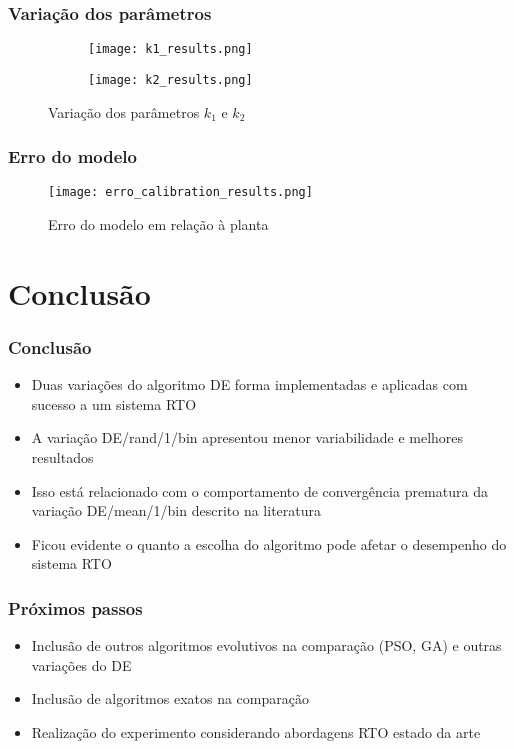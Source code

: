 \documentclass{beamer}
\begin{document}
\begin{frame}
	\frametitle{Variação dos parâmetros}
	\begin{figure}
		\centering
		\begin{subfigure}[b]{0.5\textwidth}
			\centering
			\texttt{[image: k1\_results.png]}
			\label{fig:k1_results}
		\end{subfigure}\hfill
		\begin{subfigure}[b]{0.5\textwidth}
			\centering
			\texttt{[image: k2\_results.png]}
			\label{fig:k2_results}
		\end{subfigure}
		\caption{Variação dos parâmetros $k_1$ e $k_2$}
		\label{fig:results_params}
	\end{figure}
\end{frame}


\begin{frame}
	\frametitle{Erro do modelo}
	\begin{figure}
		\centering
		\texttt{[image: erro\_calibration\_results.png]}
		\caption{Erro do modelo em relação à planta}
		\label{fig:erro_calibration_results}
	\end{figure}
\end{frame}


\section{Conclusão}
\begin{frame}
	\frametitle{Conclusão}
	\begin{itemize}
		\item Duas variações do algoritmo DE forma implementadas e aplicadas com sucesso a um sistema RTO
		\item A variação DE/rand/1/bin apresentou menor variabilidade e melhores resultados
		\item Isso está relacionado com o comportamento de convergência prematura da variação DE/mean/1/bin descrito na literatura
		\item Ficou evidente o quanto a escolha do algoritmo pode afetar o desempenho do sistema RTO
	\end{itemize}
\end{frame}


\begin{frame}
	\frametitle{Próximos passos}
	\begin{itemize}
		\item Inclusão de outros algoritmos evolutivos na comparação (PSO, GA) e outras variações do DE
		\item Inclusão de algoritmos exatos na comparação
		\item Realização do experimento considerando abordagens RTO estado da arte
	\end{itemize}
\end{frame}
\end{document}

